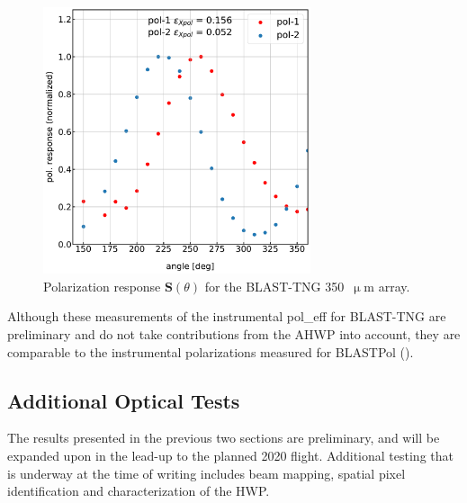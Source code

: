 \begin{figure}[!htbp]
\centering
\includegraphics[width=0.7\textwidth]{figures/blast_data/polarization/350_poleff}
\caption{Polarization response $\mathbf{S}(\theta)$ for the BLAST-TNG 350~$\upmu$m array. }
\label{fig:350 pol}
\end{figure}

Although these measurements of the instrumental \gls{pol_eff} for BLAST-TNG are preliminary and do not take contributions from the AHWP into account, they are comparable to the instrumental polarizations measured for BLASTPol (\citet{shariff2015polarimetry}).

\subsection{Additional Optical Tests}\label{more testing}

The results presented in the previous two sections are preliminary, and will be expanded upon in the lead-up to the planned 2020 flight. Additional testing that is underway at the time of writing includes beam mapping, spatial pixel identification and characterization of the HWP.

